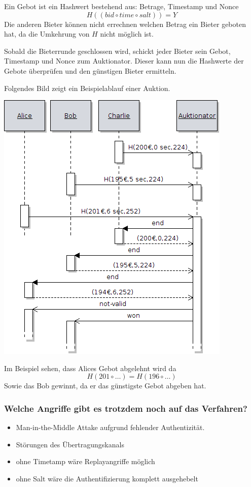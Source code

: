 Ein Gebot ist ein Hashwert bestehend aus: Betrage, Timestamp und Nonce $$H(( bid \circ time \circ salt) ) = Y$$
Die anderen Bieter können nicht errechnen welchen Betrag ein Bieter geboten hat,
da die Umkehrung von $H$ nicht möglich ist.

Sobald die Bieterrunde geschlossen wird, schickt jeder Bieter sein Gebot, Timestamp und Nonce zum Auktionator. 
Dieser kann nun die Hashwerte der Gebote überprüfen und den günstigen Bieter ermitteln.

Folgendes Bild zeigt ein Beispielablauf einer Auktion.

\begin{center}
\includegraphics[scale=0.5]{images/auction-bidding.png}
\end{center}

Im Beispiel sehen, dass Alices Gebot abgelehnt wird da $$H(  201 \circ \ldots  ) = H( 196 \circ \ldots)$$
Sowie das Bob gewinnt, da er das günstigste Gebot abgeben hat.

\subsubsection{Welche Angriffe gibt es trotzdem noch auf das Verfahren?}

\begin{itemize}
\item Man-in-the-Middle Attake aufgrund fehlender Authentizität.
\item Störungen des Übertragungskanals
\item ohne Timetamp wäre Replayangriffe möglich
\item ohne Salt wäre die Authentifizierung komplett ausgehebelt
\end{itemize}

